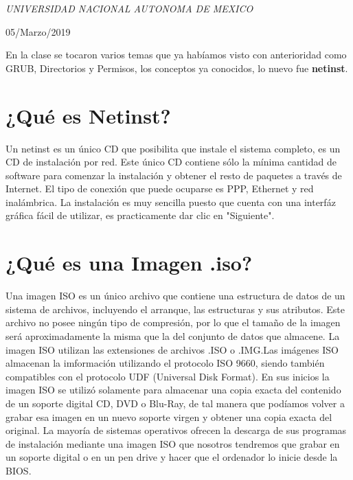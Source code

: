 \documentclass[a4paper, 11pt, oneside]{article}
\begin{document}
\begin{titlepage}
	\textit{UNIVERSIDAD NACIONAL AUTONOMA DE MEXICO} 
	
	\vfill
	
	
	
	
	\vspace{0.3\baselineskip} 
	
	05/Marzo/2019 
	
	 

\end{titlepage}
En la clase se tocaron varios temas que ya habíamos visto con anterioridad como GRUB, Directorios y Permisos, los conceptos ya conocidos, lo nuevo fue \textbf{netinst}.

\section*{¿Qué es Netinst?}
Un netinst es un único CD que posibilita que instale el sistema completo, es un CD de instalación por red. Este único CD contiene sólo la mínima cantidad de software para comenzar la instalación y obtener el resto de paquetes a través de Internet. El tipo de conexión que puede ocuparse es PPP, Ethernet y red inalámbrica. La instalación es muy sencilla puesto que cuenta con una interfáz gráfica fácil de utilizar, es practicamente dar clic en "Siguiente".

\section*{¿Qué es una Imagen .iso?}
Una imagen ISO es un único archivo que contiene una estructura de datos de un sistema de archivos, incluyendo el arranque, las estructuras y sus atributos. Este archivo no posee ningún tipo de compresión, por lo que el tamaño de la imagen será aproximadamente la misma que la del conjunto de datos que almacene. La imagen ISO utilizan las extensiones de archivos .ISO o .IMG.Las imágenes ISO almacenan la imformación utilizando el protocolo ISO 9660, siendo también compatibles con el protocolo UDF (Universal Disk Format). En sus inicios la imagen ISO se utilizó solamente para almacenar una copia exacta del contenido de un soporte digital CD, DVD o Blu-Ray, de tal manera que podíamos volver a grabar esa imagen en un nuevo soporte virgen y obtener una copia exacta del original. La mayoría de sistemas operativos ofrecen la descarga de sus programas de instalación mediante una imagen ISO que nosotros tendremos que grabar en un soporte digital o en un pen drive y hacer que el ordenador lo inicie desde la BIOS.
\end{document}
